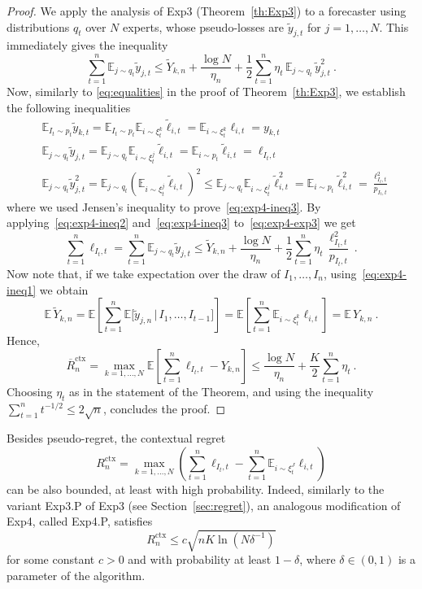\documentclass[11pt]{hackednow}
\newcommand{\E}{\mathbb{E}}
\newcommand{\oR}{\overline{R}}
\renewcommand{\tilde}{\widetilde}
\newcommand{\oRx}{\oR^{\mathrm{ctx}}}
\newcommand{\Rx}{R^{\mathrm{ctx}}}
\begin{document}
\begin{proof}
We apply the analysis of Exp3 (Theorem~\ref{th:Exp3}) to a forecaster using distributions $q_t$ over $N$ experts, whose pseudo-losses are $\tilde{y}_{j,t}$ for $j=1,\dots,N$. This immediately gives the inequality
\begin{equation}
\label{eq:exp4-exp3}
	\sum_{t=1}^n \E_{j \sim q_t}\tilde{y}_{j,t}
\le
	\tilde{Y}_{k,n} + \frac{\log N}{\eta_n} + \frac{1}{2}\sum_{t=1}^n \eta_t\,\E_{j \sim q_t}\,\tilde{y}_{j,t}^2~.
\end{equation}
Now, similarly to \eqref{eq:equalities} in the proof of Theorem~\ref{th:Exp3}, we establish the following inequalities
\begin{align}
\label{eq:exp4-ineq1}
	&\E_{I_t \sim p_t} \tilde{y}_{k,t} = \E_{I_t \sim p_t} \E_{i \sim \xi_t^k} \tilde{\ell}_{i,t} = \E_{i \sim \xi_t^k} \ell_{i,t} = y_{k,t}
\\
\label{eq:exp4-ineq2}
	&\E_{j \sim q_t} \tilde{y}_{j,t} = \E_{j \sim q_t} \E_{i \sim \xi_t^j} \tilde{\ell}_{i,t} = \E_{i \sim p_t} \tilde{\ell}_{i,t} = \ell_{I_t,t}
\\
\label{eq:exp4-ineq3}
	&\E_{j \sim q_t} \tilde{y}^2_{j,t} = \E_{j \sim q_t} \left(\E_{i \sim \xi_t^j} \tilde{\ell}_{i,t}\right)^2 \le \E_{j \sim q_t} \E_{i \sim \xi_t^j} \tilde{\ell}_{i,t}^2 = \E_{i \sim p_t} \tilde{\ell}_{i,t}^2 = \frac{\ell_{I_t,t}^2}{p_{I_t,t}}
\end{align}
where we used Jensen's inequality to prove~\eqref{eq:exp4-ineq3}.
By applying~\eqref{eq:exp4-ineq2} and~\eqref{eq:exp4-ineq3} to~\eqref{eq:exp4-exp3} we get
\[
	\sum_{t=1}^n \ell_{I_t,t}
=
	\sum_{t=1}^n \E_{j \sim q_t} \tilde{y}_{j,t}
\le
	\tilde{Y}_{k,n} + \frac{\log N}{\eta_n} + \frac{1}{2}\sum_{t=1}^n \eta_t\,\frac{\ell_{I_t,t}^2}{p_{I_t,t}}~.
\]
Now note that, if we take expectation over the draw of $I_1,\dots,I_n$, using~\eqref{eq:exp4-ineq1} we obtain
\[
	\E\,\tilde{Y}_{k,n} = \E\left[\sum_{t=1}^n \E\bigl[\tilde{y}_{j,n} \,\big|\, I_1,\dots,I_{t-1} \bigr] \right] =  \E\left[\sum_{t=1}^n \E_{i \sim \xi_t^k} \ell_{i,t} \right] = \E\,Y_{k,n}~.
\]
Hence,
\[
	\oRx_n = \max_{k=1,\dots,N} \E\left[ \sum_{t=1}^n \ell_{I_t,t} - Y_{k,n} \right]
\le
	 \frac{\log N}{\eta_n} + \frac{K}{2}\sum_{t=1}^n \eta_t~.
\]
Choosing $\eta_t$ as in the statement of the Theorem, and using the inequality $\sum_{t=1}^n t^{-1/2} \le 2\sqrt{n}$, concludes the proof.
\end{proof}
%
Besides pseudo-regret, the contextual regret
\[
	\Rx_n = \max_{k=1,\dots,N} \left( \sum_{t=1}^n \ell_{I_t,t} - \sum_{t=1}^n \E_{i \sim \xi_t^J} \ell_{i,t} \right)
\]
can be also bounded, at least with high probability. Indeed, similarly to the variant Exp3.P of Exp3 (see Section~\ref{sec:regret}), an analogous modification of Exp4, called Exp4.P, satisfies
\[
    \Rx_n \le c\sqrt{n K \ln(N \delta^{-1})}
\]
for some constant $c > 0$ and with probability at least $1-\delta$, where $\delta \in (0,1)$ is a parameter of the algorithm.
\end{document}
